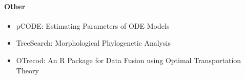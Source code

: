 \hypertarget{other}{%
\paragraph{Other}\label{other}}

\begin{itemize}
\tightlist
\item
  pCODE: Estimating Parameters of ODE Models
\item
  TreeSearch: Morphological Phylogenetic Analysis
\item
  OTrecod: An R Package for Data Fusion using Optimal Transportation Theory
\end{itemize}


\address{%
Catherine Hurley\\
Maynooth University\\%
\\
%
\url{https://journal.r-project.org}\\%
%
\href{mailto:r-journal@r-project.org}{\nolinkurl{r-journal@r-project.org}}%
}

